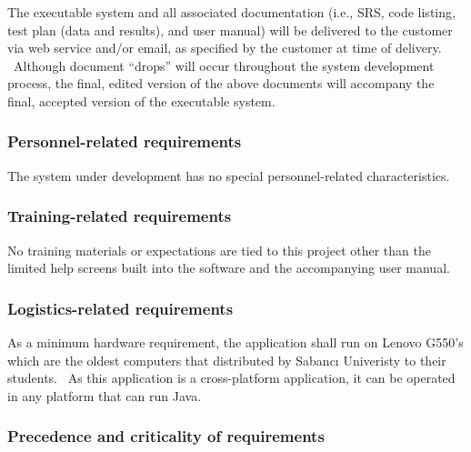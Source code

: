 \documentclass[twoside,letterpaper]{article}
\begin{document}
{\color{black}
The executable system and all associated documentation (i.e., SRS,
code listing, test plan (data and results), and user manual) will be
delivered to the customer via web service and/or email, as
specified by the customer at time of delivery. \ Although document
{\textquotedblleft}drops{\textquotedblright} will occur throughout the
system development process, the final, edited version of the above
documents will accompany the final, accepted version of the executable
system.}

\subsubsection[Personnel{}-related
requirements]{\rmfamily\bfseries\color{black}
Personnel-related requirements}

{\color{black}
The system under development has no special personnel-related
characteristics. }

\subsubsection[Training{}-related
requirements]{\rmfamily\bfseries\color{black}
Training-related requirements}

{\color{black}
No training materials or expectations are tied to this project other
than the limited help screens built into the software and the
accompanying user manual.}

\subsubsection[Logistics{}-related
requirements]{\rmfamily\bfseries\color{black}
Logistics-related requirements}

{\color{black}
As a minimum hardware requirement, the application shall run on Lenovo G550{\textquoteright}s which are the oldest computers that distributed by Sabanc\i{} Univeristy to their students. \ As this application is a cross-platform application, it can be operated in any platform that can run Java.}

\subsubsection[Precedence and criticality of
requirements]{\rmfamily\bfseries\color{black}
Precedence and criticality of requirements}
\end{document}

